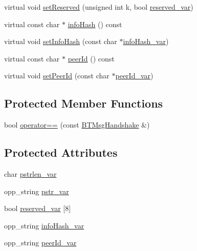 \begin{DoxyCompactItemize}
\item 
virtual void \hyperlink{classBTMsgHandshake_ade2372fe17094b3aefc6bb5bd6d32bbd}{set\+Reserved} (unsigned int k, bool \hyperlink{classBTMsgHandshake_a289f010d689e2d2649e1585c6eb8a683}{reserved\+\_\+var})
\item 
virtual const char $\ast$ \hyperlink{classBTMsgHandshake_a5a74e2bd313765bcb504119e97d80a47}{info\+Hash} () const 
\item 
virtual void \hyperlink{classBTMsgHandshake_a546d2963e8e7e8066bceb00e1e4d1df2}{set\+Info\+Hash} (const char $\ast$\hyperlink{classBTMsgHandshake_a6c79f9de6d2c47ecf9a1f7172ce10bef}{info\+Hash\+\_\+var})
\item 
virtual const char $\ast$ \hyperlink{classBTMsgHandshake_ab9e8f0a422844b270542b94813f6d564}{peer\+Id} () const 
\item 
virtual void \hyperlink{classBTMsgHandshake_a0556438c3711ed78b72732942f357585}{set\+Peer\+Id} (const char $\ast$\hyperlink{classBTMsgHandshake_a269237a5af72db85d27cd1080e998cd8}{peer\+Id\+\_\+var})
\end{DoxyCompactItemize}
\subsection*{Protected Member Functions}
\begin{DoxyCompactItemize}
\item 
bool \hyperlink{classBTMsgHandshake_ad8a228811e1c2fc12272a7d263becef2}{operator==} (const \hyperlink{classBTMsgHandshake}{B\+T\+Msg\+Handshake} \&)
\end{DoxyCompactItemize}
\subsection*{Protected Attributes}
\begin{DoxyCompactItemize}
\item 
char \hyperlink{classBTMsgHandshake_aac6817b686487e3646ff1ec8ffe28965}{pstrlen\+\_\+var}
\item 
opp\+\_\+string \hyperlink{classBTMsgHandshake_a913d64395dfd4230c77881950871df18}{pstr\+\_\+var}
\item 
bool \hyperlink{classBTMsgHandshake_a289f010d689e2d2649e1585c6eb8a683}{reserved\+\_\+var} \mbox{[}8\mbox{]}
\item 
opp\+\_\+string \hyperlink{classBTMsgHandshake_a6c79f9de6d2c47ecf9a1f7172ce10bef}{info\+Hash\+\_\+var}
\item 
opp\+\_\+string \hyperlink{classBTMsgHandshake_a269237a5af72db85d27cd1080e998cd8}{peer\+Id\+\_\+var}
\end{DoxyCompactItemize}


